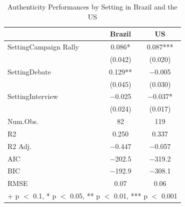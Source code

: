 \documentclass[smallextended]{svjour3}       %
\begin{document}
\begin{table}

\caption{\label{tab:appendix 2}Authenticity Performances by Setting in Brazil and the US}
\centering
\begin{tabular}[t]{lcc}
\toprule
  & Brazil & US\\
\midrule
SettingCampaign Rally & \num{0.086}* & \num{0.087}***\\
 & (\num{0.042}) & (\num{0.020})\\
SettingDebate & \num{0.129}** & \num{-0.005}\\
 & (\num{0.045}) & (\num{0.030})\\
SettingInterview & \num{-0.025} & \num{-0.037}*\\
 & (\num{0.024}) & (\num{0.017})\\
\midrule
Num.Obs. & \num{82} & \num{119}\\
R2 & \num{0.250} & \num{0.337}\\
R2 Adj. & \num{-0.447} & \num{-0.057}\\
AIC & \num{-202.5} & \num{-319.2}\\
BIC & \num{-192.9} & \num{-308.1}\\
RMSE & \num{0.07} & \num{0.06}\\
\bottomrule
\multicolumn{3}{l}{\rule{0pt}{1em}+ p $<$ 0.1, * p $<$ 0.05, ** p $<$ 0.01, *** p $<$ 0.001}\\
\end{tabular}
\end{table}




\end{document}
